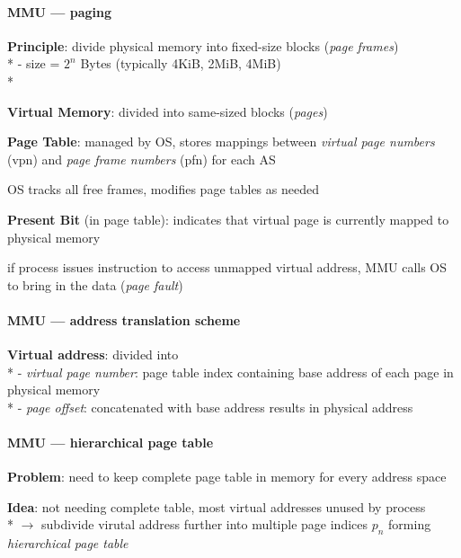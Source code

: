 \paragraph{MMU --- paging}
\begin{items}
  \item \textbf{Principle}: divide physical memory into fixed-size blocks (\emph{page frames}) \\*
    - size = \( 2^n \) Bytes (typically 4KiB, 2MiB, 4MiB) \\*
  \item \textbf{Virtual Memory}: divided into same-sized blocks (\emph{pages})
  \item \textbf{Page Table}: managed by OS, stores mappings between \emph{virtual page numbers} (vpn) and \emph{page frame numbers} (pfn) for each AS
  \item OS tracks all free frames, modifies page tables as needed
  \item \textbf{Present Bit} (in page table): indicates that virtual page is currently mapped to physical memory
  \item if process issues instruction to access unmapped virtual address, MMU calls OS to bring in the data (\emph{page fault})
\end{items}

\paragraph{MMU --- address translation scheme}
\begin{items}
  \item \textbf{Virtual address}: divided into \\*
    - \emph{virtual page number}: page table index containing base address of each page in physical memory \\*
    - \emph{page offset}: concatenated with base address results in physical address
\end{items}

\paragraph{MMU --- hierarchical page table}
\begin{items}
  \item \textbf{Problem}: need to keep complete page table in memory for every address space
  \item \textbf{Idea}: not needing complete table, most virtual addresses unused by process \\*
    \( \to \) subdivide virutal address further into multiple page indices \( p_n \) forming \emph{hierarchical page table}
\end{items}

